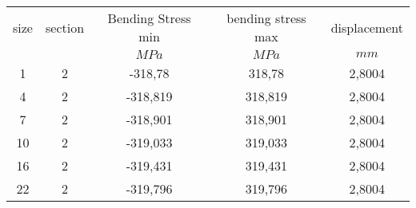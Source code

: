 \begin{tabular}{ccccc}
\hline
size 	& section	& Bending Stress min 	&	bending stress max	&	displacement\\
		&			& $MPa$					& 	$MPa$				& $mm$\\
\hline
1		&	2		&	-318,78				&	318,78				&	2,8004\\
4		&	2		&	-318,819			&	318,819				&	2,8004\\
7		&	2  		&	-318,901			&	318,901				&	2,8004\\
10		&	2		&	-319,033			&	319,033				&	2,8004\\
16		&	2		&	-319,431			&	319,431				&	2,8004\\
22		&	2		&	-319,796			&	319,796				&	2,8004\\
\hline
\end{tabular}